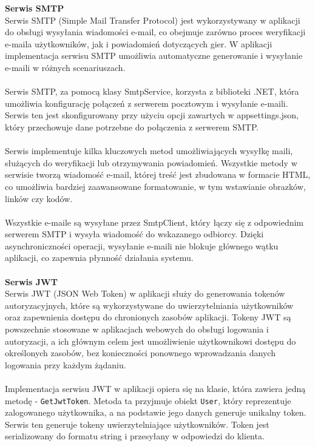 \documentclass[twoside]{projektInzynierskiMS1}
\begin{document}
\newpage

\noindent \textbf{Serwis SMTP}\\
Serwis SMTP (Simple Mail Transfer Protocol) jest wykorzystywany w aplikacji do obsługi wysyłania wiadomości e-mail, co obejmuje zarówno proces weryfikacji e-maila użytkowników, jak i powiadomień dotyczących gier. W aplikacji implementacja serwisu SMTP umożliwia automatyczne generowanie i wysyłanie e-maili w różnych scenariuszach.
\\\\
Serwis SMTP, za pomocą klasy SmtpService, korzysta z biblioteki .NET, która umożliwia konfigurację połączeń z serwerem pocztowym i wysyłanie e-maili. Serwis ten jest skonfigurowany przy użyciu opcji zawartych w appsettings.json, który przechowuje dane potrzebne do połączenia z serwerem SMTP.
\\\\
Serwis implementuje kilka kluczowych metod umożliwiających wysyłkę maili, służących do weryfikacji lub otrzymywania powiadomień. Wszystkie metody w serwisie tworzą wiadomość e-mail, której treść jest zbudowana w formacie HTML, co umożliwia bardziej zaawansowane formatowanie, w tym wstawianie obrazków, linków czy kodów.
\\\\
Wszystkie e-maile są wysyłane przez SmtpClient, który łączy się z odpowiednim serwerem SMTP i wysyła wiadomość do wskazanego odbiorcy. Dzięki asynchroniczności operacji, wysyłanie e-maili nie blokuje głównego wątku aplikacji, co zapewnia płynność działania systemu.
\\\\

\noindent \textbf{Serwis JWT}\\
Serwis JWT (JSON Web Token) w aplikacji służy do generowania tokenów autoryzacyjnych, które są wykorzystywane do uwierzytelniania użytkowników oraz zapewnienia dostępu do chronionych zasobów aplikacji. Tokeny JWT są powszechnie stosowane w aplikacjach webowych do obsługi logowania i autoryzacji, a ich głównym celem jest umożliwienie użytkownikowi dostępu do określonych zasobów, bez konieczności ponownego wprowadzania danych logowania przy każdym żądaniu.
\\\\
Implementacja serwisu JWT w aplikacji opiera się na klasie, która zawiera jedną metodę - \texttt{GetJwtToken}. Metoda ta przyjmuje obiekt \texttt{User}, który reprezentuje zalogowanego użytkownika, a na podstawie jego danych generuje unikalny token. Serwis ten generuje tokeny uwierzytelniające użytkowników. Token jest serializowany do formatu string i przesyłany w odpowiedzi do klienta.
\end{document}
